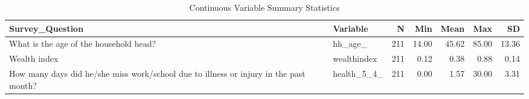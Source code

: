 \begin{table}[!t]
\caption*{
{\large Continuous Variable Summary Statistics}
} 
\fontsize{12.0pt}{14.4pt}\selectfont
\begin{tabular*}{\linewidth}{@{\extracolsep{\fill}}llrrrrr}
\toprule
Survey\_Question & Variable & N & Min & Mean & Max & SD \\ 
\midrule\addlinespace[2.5pt]
What is the age of the household head? & hh\_age\_ & 211 & 14.00 & 45.62 & 85.00 & 13.36 \\ 
Wealth index & wealthindex & 211 & 0.12 & 0.38 & 0.88 & 0.14 \\ 
How many days did he/she miss work/school due to illness or injury in the past month? & health\_5\_4\_ & 211 & 0.00 & 1.57 & 30.00 & 3.31 \\ 
\bottomrule
\end{tabular*}
\end{table}


